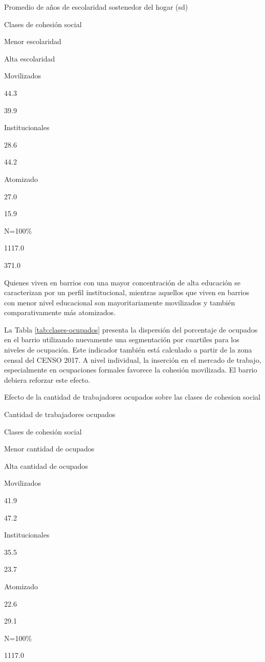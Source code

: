 \documentclass[
  12pt,
]{book}
\begin{document}
Promedio de años de escolaridad sostenedor del hogar (sd)

Clases de cohesión social

Menor escolaridad

Alta escolaridad

Movilizados

44.3

39.9

Institucionales

28.6

44.2

Atomizado

27.0

15.9

N=100\%

1117.0

371.0

Quienes viven en barrios con una mayor concentración de alta educación se caracterizan por un perfil institucional, mientras aquellos que viven en barrios con menor nivel educacional son mayoritariamente movilizados y también comparativamente más atomizados.

La Tabla \ref{tab:clases-ocupados} presenta la dispersión del porcentaje de ocupados en el barrio utilizando nuevamente una segmentación por cuartiles para los niveles de ocupación. Este indicador también está calculado a partir de la zona censal del CENSO 2017. A nivel individual, la inserción en el mercado de trabajo, especialmente en ocupaciones formales favorece la cohesión movilizada. El barrio debiera reforzar este efecto.

\label{tab:clases-ocupados}Efecto de la cantidad de trabajadores ocupados sobre las clases de cohesion social

Cantidad de trabajadores ocupados

Clases de cohesión social

Menor cantidad de ocupados

Alta cantidad de ocupados

Movilizados

41.9

47.2

Institucionales

35.5

23.7

Atomizado

22.6

29.1

N=100\%

1117.0
\end{document}
